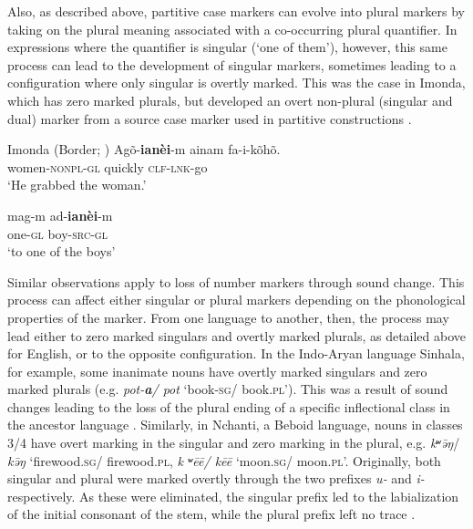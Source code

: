 \documentclass[output=paper]{langsci/langscibook}
\begin{document}
Also, as described above, partitive case markers can evolve into plural markers by
taking on the plural meaning associated with a co-occurring plural
quantifier. In expressions where the quantifier is singular (`one of
them'), however, this same process can lead to the development of
singular markers, sometimes leading to a configuration where only singular
is overtly marked. This was the case in Imonda, which has zero marked plurals, but developed
an overt non-plural
(singular and dual) marker
 from a source case marker used in partitive constructions .

\ea\label{imonda2}
Imonda (Border; )
\ea
\gll Agõ-\textbf{{ianèi}}-m ainam fa-i-kõhõ.\\
women-\textsc{nonpl-gl} quickly \textsc{clf-lnk}-go\\
\glt `He grabbed the woman.' 

\ex
\gll mag-m ad-\textbf{{ianèi}}-m \\
one-\textsc{gl} boy-\textsc{src-gl} \\
\glt `to one of the boys'


\z
\z


Similar observations apply to loss of number markers through sound
change. This process can affect
either singular or plural markers depending on the phonological
properties of the marker. From one language to another, then, the process may lead either to  zero marked singulars and
overtly marked plurals, as detailed above for
English, or to the opposite configuration. In the
Indo-Aryan language Sinhala,  for example, some inanimate nouns have
overtly marked singulars and
zero marked plurals
 (e.g. {\em pot-\textbf{\textit {a}}/ pot} `book-\textsc{sg}/ book.\textsc{pl}'). This was a result of
 sound changes leading to the loss of the plural ending of a specific inflectional class in the ancestor language
 \citealt[250--256]{NitzNordhoff2010}. Similarly, in Nchanti, a Beboid
 language, nouns in classes 3/4 have overt
  marking in the singular and zero marking in the plural, e.g. {\em
    k{\bf ʷ}\=əŋ}/ {\em
    k\=əŋ} `firewood.\textsc{sg}/ firewood.\textsc{pl}, {\em k{\bf
      ʷ}ēē/ kēē} `moon.\textsc{sg}/ moon.\textsc{pl}'.
  Originally, both singular and plural were marked overtly through the
  two prefixes {\em *u-} and {\em *i-} respectively. As these were
  eliminated, the singular prefix led to the labialization of the
  initial consonant of the stem, while the plural prefix left no trace
  \cite{Hombert1980}.
\end{document}
